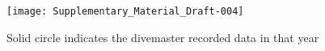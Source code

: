 \documentclass[a4paper]{article}
\begin{document}








%


\begin{figure}[h!]
\texttt{[image: Supplementary\_Material\_Draft-004]}
\caption{Solid circle indicates the divemaster recorded data in that year}
\end{figure}
\end{document}
